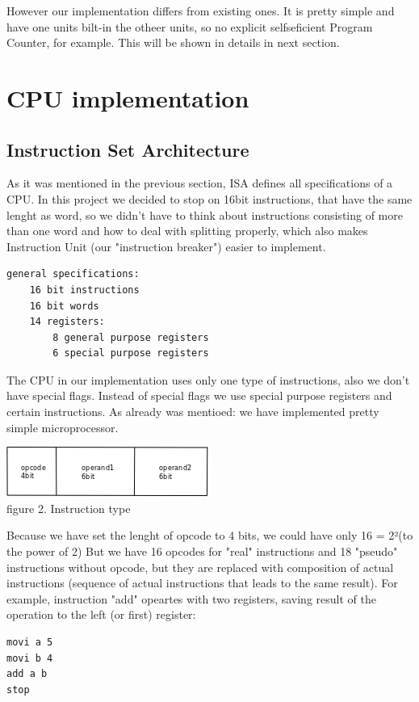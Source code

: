 \documentclass[11pt,a4paper]{article}
\begin{document}
However our implementation differs from existing ones. It is pretty simple and have one units bilt-in the otheer units, so no explicit selfseficient Program Counter, for example. This will be shown in details in next section.\\ 

\newpage
\section{CPU implementation}
\subsection{Instruction Set Architecture}
As it was mentioned in the previous section, ISA defines all specifications of a CPU. In this project we decided to stop on 16bit instructions, that have the same lenght as word, so we didn't have to think about instructions consisting of more than one word and how to deal with splitting properly, which also makes Instruction Unit (our "instruction breaker") easier to implement.
\begin{verbatim}
general specifications:
	16 bit instructions
	16 bit words
	14 registers:
		8 general purpose registers
		6 special purpose registers
\end{verbatim}
The CPU in our implementation uses only one type of instructions, also we don't have special flags. Instead of special flags we use special purpose registers and certain instructions. As already was mentioed: we have implemented pretty simple microprocessor.
\begin{center}
\includegraphics[scale=0.7]{pics/instruction1.png}\\
figure 2. Instruction type
\end{center}
Because we have set the lenght of opcode to 4 bits, we could have only 16 = 2²(to the power of 2) But we have 16 opcodes for "real" instructions and 18 "pseudo" instructions without opcode, but they are replaced with composition of actual instructions (sequence of actual instructions that leads to the same result). For example, instruction "add" opeartes with two registers, saving result of the operation to the left (or first) register:
\begin{verbatim}
movi a 5
movi b 4
add a b
stop
\end{verbatim}
\end{document}
